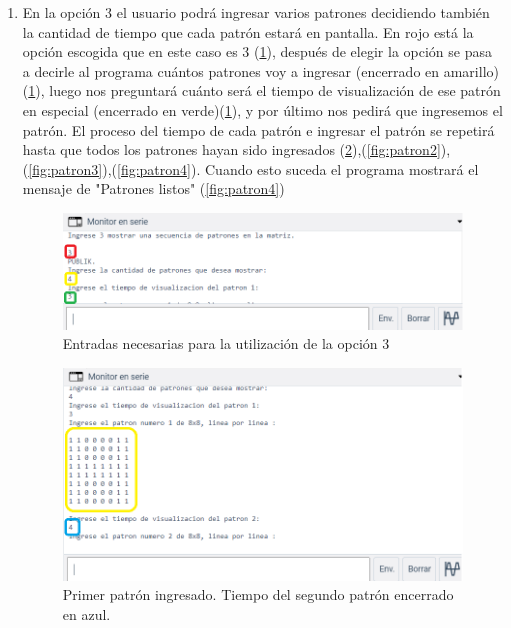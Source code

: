 \documentclass{article}
\begin{document}
\begin{enumerate}
\item En la opción 3 el usuario podrá ingresar varios patrones decidiendo también la cantidad de tiempo que cada patrón estará en pantalla. En rojo está la opción escogida que en este caso es 3 (\ref{fig:opcion3}), después de elegir la opción se pasa a decirle al programa cuántos patrones voy a ingresar (encerrado en amarillo) (\ref{fig:opcion3}), luego nos preguntará cuánto será el tiempo de visualización de ese patrón en especial (encerrado en verde)(\ref{fig:opcion3}), y por último nos pedirá que ingresemos el patrón.
El proceso del tiempo de cada patrón e ingresar el patrón se repetirá hasta que todos los patrones hayan sido ingresados (\ref{fig:patron1}),(\ref{fig:patron2}),(\ref{fig:patron3}),(\ref{fig:patron4}). Cuando esto suceda el programa mostrará el mensaje de "Patrones listos" (\ref{fig:patron4})

\begin{figure}[h]
\includegraphics[scale=0.8]{opc3.png}
\centering
\caption{Entradas necesarias para la utilización de la opción 3}
\label{fig:opcion3}
\end{figure}

\newpage
\begin{figure}[h]
\includegraphics[scale=0.8]{patrones.png}
\centering
\caption{Primer patrón ingresado. Tiempo del segundo patrón encerrado en azul.}
\label{fig:patron1}
\end{figure}


\end{enumerate}
\end{document}

